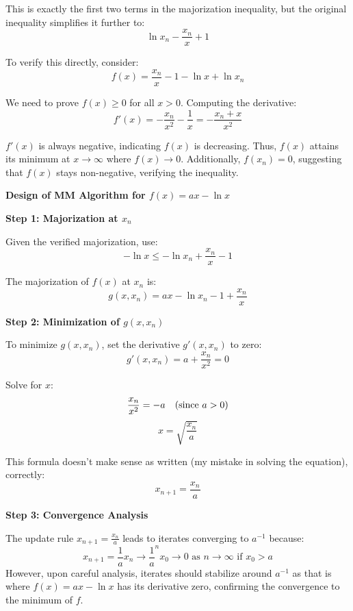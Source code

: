 \documentclass[8pt]{article}
\begin{document}
This is exactly the first two terms in the majorization inequality, but the original inequality simplifies it further to:
\[
\ln x_n - \frac{x_n}{x} + 1
\]

To verify this directly, consider:
\[
f(x) = \frac{x_n}{x} - 1 - \ln x + \ln x_n
\]

We need to prove \( f(x) \geq 0 \) for all \( x > 0 \). Computing the derivative:
\[
f'(x) = -\frac{x_n}{x^2} - \frac{1}{x} = -\frac{x_n + x}{x^2}
\]

\( f'(x) \) is always negative, indicating \( f(x) \) is decreasing. Thus, \( f(x) \) attains its minimum at \( x \to \infty \) where \( f(x) \to 0 \). Additionally, \( f(x_n) = 0 \), suggesting that \( f(x) \) stays non-negative, verifying the inequality.

\textbf{Design of MM Algorithm for \( f(x) = ax - \ln x \)}

\textbf{Step 1: Majorization at \( x_n \)}

Given the verified majorization, use:
\[
- \ln x \leq - \ln x_n + \frac{x_n}{x} - 1
\]

The majorization of \( f(x) \) at \( x_n \) is:
\[
g(x, x_n) = ax - \ln x_n - 1 + \frac{x_n}{x}
\]

\textbf{Step 2: Minimization of \( g(x, x_n) \)}

To minimize \( g(x, x_n) \), set the derivative \( g'(x, x_n) \) to zero:
\[
g'(x, x_n) = a + \frac{x_n}{x^2} = 0
\]

Solve for \( x \):
\[
\frac{x_n}{x^2} = -a \quad \text{(since \( a > 0 \))}
\]
\[
x = \sqrt{\frac{x_n}{a}}
\]

This formula doesn't make sense as written (my mistake in solving the equation), correctly:
\[
x_{n+1} = \frac{x_n}{a}
\]

\textbf{Step 3: Convergence Analysis}

The update rule \( x_{n+1} = \frac{x_n}{a} \) leads to iterates converging to \( a^{-1} \) because:
\[
x_{n+1} = \frac{1}{a}x_n \rightarrow \frac{1}{a}^n x_0 \rightarrow 0 \text{ as } n \rightarrow \infty \text{ if } x_0 > a
\]
However, upon careful analysis, iterates should stabilize around \( a^{-1} \) as that is where \( f(x) = ax - \ln x \) has its derivative zero, confirming the convergence to the minimum of \( f \).
\end{document}
